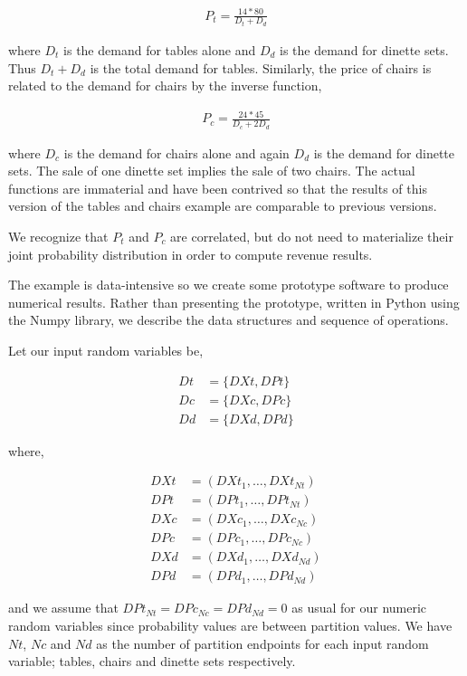 \begin{align*}
P_t = \frac{14*80}{D_t + D_d}
\end{align*}

where $D_t$ is the demand for tables alone and $D_d$ is the demand for
dinette sets. Thus $D_t + D_d$ is the total demand for tables. Similarly, the
price of chairs is related to the demand for chairs by the inverse
function,

\begin{align*}
P_c = \frac{24*45}{D_c + 2D_d}
\end{align*}

where $D_c$ is the demand for chairs alone and again $D_d$ is the
demand for dinette sets. The sale of one dinette set implies the sale
of two chairs. The actual functions are immaterial and have been
contrived so that the results of this version of the tables and chairs
example are comparable to previous versions. 

We recognize that $P_t$ and $P_c$ are correlated, but do not need to
materialize their joint probability distribution in order to compute
revenue results.

The example is data-intensive so we create some prototype software to
produce numerical results. Rather than presenting the prototype,
written in Python using the Numpy library, we describe the data
structures and sequence of operations.

Let our input random variables be,

\begin{align*}
Dt &= \{DXt, DPt\}\\
Dc &= \{DXc, DPc\}\\
Dd &= \{DXd, DPd\}
\end{align*}

where,

\begin{align*}
DXt &= (DXt_1, \dots, DXt_{Nt})\\
DPt &= (DPt_1, \dots, DPt_{Nt})\\
DXc &= (DXc_1, \dots, DXc_{Nc})\\
DPc &= (DPc_1, \dots, DPc_{Nc})\\
DXd &= (DXd_1, \dots, DXd_{Nd})\\
DPd &= (DPd_1, \dots, DPd_{Nd})
\end{align*}

and we assume that $DPt_{Nt} = DPc_{Nc} = DPd_{Nd} = 0$ as usual for
our numeric random variables since probability values are between
partition values. We have $Nt$, $Nc$ and $Nd$ as the number of
partition endpoints for each input random variable; tables, chairs and
dinette sets respectively.


